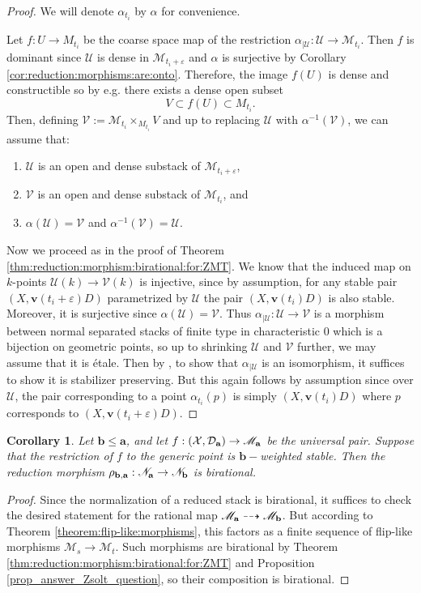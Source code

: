 \documentclass[11pt]{amsart}
\newtheorem{cor}[theorem]{Corollary}
\theoremstyle{definition}
\theoremstyle{remark}
\newcommand{\calU}{\mathcal U}
\newcommand{\calX}{\mathcal X}
\newcommand{\calD}{\mathcal D}
\newcommand{\calV}{\mathcal V}
\newcommand{\sM}{\mathscr{M}}
\newcommand{\sN}{\mathscr{N}}
\newcommand{\bfa}{\mathbf{a}}
\newcommand{\bfv}{\mathbf{v}}
\newcommand{\bfb}{\mathbf{b}}
\begin{document}
	\begin{proof} We will denote $\alpha_{t_i}$ by $\alpha$ for convenience. 
		
		Let $f : U \to M_{t_i}$ be the coarse space map of the restriction $\alpha_{|\calU}:\calU \to \sM_{t_i}$. Then $f$ is dominant since $\calU$ is dense in $\sM_{t_i + \varepsilon}$ and $\alpha$ is surjective by Corollary \ref{cor:reduction:morphisms:are:onto}. Therefore, the image $f(U)$ is dense and constructible so by e.g. \cite[Chapter 2, Exercises 3.18-3.19]{Har77} there exists a dense open subset 
		$$
		V \subset f(U) \subset M_{t_i}. 
		$$
		Then, defining $\calV := \sM_{t_i} \times_{M_{t_i}} V$ and up to replacing $\calU$ with $\alpha^{-1}(\calV)$, we can assume that:\begin{enumerate}
			\item $\calU$ is an open and dense substack of $\sM_{t_i+\varepsilon}$,
			\item $\calV$ is an open and dense substack of $\sM_{t_i}$, and
			\item $\alpha(\calU) =\calV$ and $\alpha^{-1}(\calV) = \calU$.
		\end{enumerate}
		
		Now we proceed as in the proof of Theorem \ref{thm:reduction:morphism:birational:for:ZMT}. We know that the induced map on $k$-points $\calU(k) \to \calV(k)$ is injective, since by assumption, for any stable pair $(X, \bfv(t_i + \varepsilon)D)$ parametrized by $\calU$ the pair $(X, \bfv(t_i)D)$ is also stable. Moreover, it is surjective since $\alpha(\calU) = \calV$. Thus $\alpha_{|\calU}:\calU \to \calV$ is a morphism between normal separated stacks of finite type in characteristic $0$ which is a bijection on geometric points, so up to shrinking $\calU$ and $\calV$ further, we may assume that it is \'etale. Then by \cite[Lemma 3.1]{alpkr}, to show that $\alpha_{|\calU}$ is an isomorphism, it suffices to show it is stabilizer preserving. But this again follows by assumption since over $\calU$, the pair corresponding to a point $\alpha_{t_i}(p)$ is simply $(X, \bfv(t_i)D)$ where $p$ corresponds to $(X, \bfv(t_i+\varepsilon)D)$. \end{proof}
	
	\begin{cor}\label{cor:reductionbirational}
		Let $\bfb \le \bfa$, and let $f:(\calX,\calD_{\bf a})\to \sM_{\bfa}$ be the universal pair. Suppose that the restriction of $f$ to the generic point is $\bfb-$weighted stable. Then the reduction morphism $\rho_{\bf b,a} : \sN_\bfa \to \sN_\bfb$ is birational.
	\end{cor}
	\begin{proof}
		Since the normalization of a reduced stack is birational, it suffices to check the desired statement for the rational map $\sM_{\bf a}\dashrightarrow \sM_{\bf b}$. But according to Theorem \ref{theorem:flip-like:morphisms}, this factors as a finite sequence of flip-like morphisms $\sM_s \to \sM_t$. Such morphisms are birational by Theorem \ref{thm:reduction:morphism:birational:for:ZMT} and Proposition \ref{prop_answer_Zsolt_question}, so their composition is birational.
	\end{proof}
	
\end{document}
